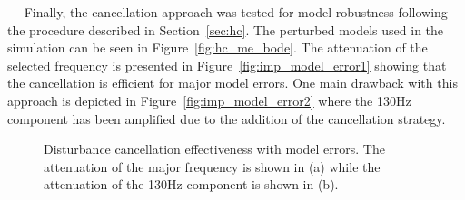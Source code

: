 \newpage~\newpage~
\FloatBarrier
Finally, the cancellation approach was tested for model robustness following the procedure described in Section~\ref{sec:hc}. The perturbed models used in the simulation can be seen in Figure~\ref{fig:hc_me_bode}. The attenuation of the selected frequency is presented in Figure~\ref{fig:imp_model_error1} showing that the cancellation is efficient for major model errors. One main drawback with this approach is depicted in Figure~\ref{fig:imp_model_error2} where the 130Hz component has been amplified due to the addition of the \abbrIMP cancellation strategy.


\begin{figure}[h!]
  \centering %
  \qquad
  \caption{\label{fig:imp_model_error}  Disturbance cancellation effectiveness with model errors. The attenuation of the major frequency is shown in (a) while the attenuation of the 130Hz component is shown in (b).}
\end{figure}

